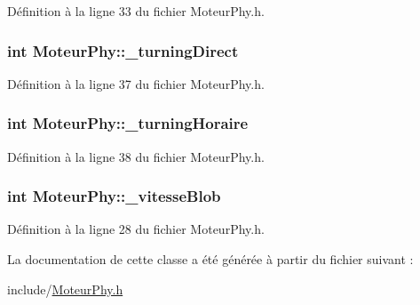 Définition à la ligne 33 du fichier MoteurPhy.h.

\hypertarget{a00013_ae1c1702bbaa2ecae65150c4af9b1712a}{
\subsubsection[{\_\-turningDirect}]{\setlength{\rightskip}{0pt plus 5cm}int {\bf MoteurPhy::\_\-turningDirect}}}
\label{a00013_ae1c1702bbaa2ecae65150c4af9b1712a}


Définition à la ligne 37 du fichier MoteurPhy.h.

\hypertarget{a00013_a1a8ace56710143ada31add1aaa159f26}{
\subsubsection[{\_\-turningHoraire}]{\setlength{\rightskip}{0pt plus 5cm}int {\bf MoteurPhy::\_\-turningHoraire}}}
\label{a00013_a1a8ace56710143ada31add1aaa159f26}


Définition à la ligne 38 du fichier MoteurPhy.h.

\hypertarget{a00013_adddea379291ef88ec19e7cc8f6dc13c8}{
\subsubsection[{\_\-vitesseBlob}]{\setlength{\rightskip}{0pt plus 5cm}int {\bf MoteurPhy::\_\-vitesseBlob}}}
\label{a00013_adddea379291ef88ec19e7cc8f6dc13c8}


Définition à la ligne 28 du fichier MoteurPhy.h.



La documentation de cette classe a été générée à partir du fichier suivant :\begin{DoxyCompactItemize}
\item 
include/\hyperlink{a00031}{MoteurPhy.h}\end{DoxyCompactItemize}
